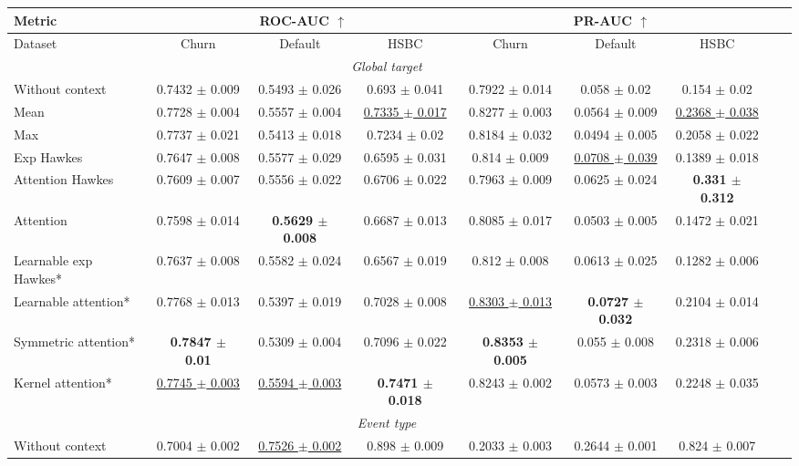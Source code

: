 \begin{table*}[!t]
\centering
\begin{tabular}{lcccccccc}\hline
Metric &\multicolumn{3}{c|}{ROC-AUC $\uparrow$} &\multicolumn{3}{c}{PR-AUC $\uparrow$} \\\hline
Dataset &Churn &Default &HSBC &Churn &Default &HSBC \\
\hline
\multicolumn{7}{c}{\textit{Global target}} \\
\hline
Without context & 0.7432 $\pm$ 0.009 & 0.5493 $\pm$ 0.026 & 0.693 $\pm$ 0.041 & 0.7922 $\pm$ 0.014 & 0.058 $\pm$ 0.02 & 0.154 $\pm$ 0.02 \\
  Mean & 0.7728 $\pm$ 0.004 & 0.5557 $\pm$ 0.004 & \underline{0.7335 $\pm$ 0.017} & 0.8277 $\pm$ 0.003 & 0.0564 $\pm$ 0.009 & \underline{0.2368 $\pm$ 0.038} \\
  Max & 0.7737 $\pm$ 0.021 & 0.5413 $\pm$ 0.018 & 0.7234 $\pm$ 0.02 & 0.8184 $\pm$ 0.032 & 0.0494 $\pm$ 0.005 & 0.2058 $\pm$ 0.022 \\
  Exp Hawkes & 0.7647 $\pm$ 0.008 & 0.5577 $\pm$ 0.029 & 0.6595 $\pm$ 0.031 & 0.814 $\pm$ 0.009 & \underline{0.0708 $\pm$ 0.039} & 0.1389 $\pm$ 0.018 \\
  Attention Hawkes & 0.7609 $\pm$ 0.007 & 0.5556 $\pm$ 0.022 & 0.6706 $\pm$ 0.022 & 0.7963 $\pm$ 0.009 & 0.0625 $\pm$ 0.024 & \textbf{0.331 $\pm$ 0.312} \\
  Attention & 0.7598 $\pm$ 0.014 & \textbf{0.5629 $\pm$ 0.008} & 0.6687 $\pm$ 0.013 & 0.8085 $\pm$ 0.017 & 0.0503 $\pm$ 0.005 & 0.1472 $\pm$ 0.021 \\
  Learnable exp Hawkes* & 0.7637 $\pm$ 0.008 & 0.5582 $\pm$ 0.024 & 0.6567 $\pm$ 0.019 & 0.812 $\pm$ 0.008 & 0.0613 $\pm$ 0.025 & 0.1282 $\pm$ 0.006 \\
  Learnable attention* & 0.7768 $\pm$ 0.013 & 0.5397 $\pm$ 0.019 & 0.7028 $\pm$ 0.008 & \underline{0.8303 $\pm$ 0.013} & \textbf{0.0727 $\pm$ 0.032 }& 0.2104 $\pm$ 0.014 \\
  Symmetric attention* & \textbf{0.7847 $\pm$ 0.01} & 0.5309 $\pm$ 0.004 & 0.7096 $\pm$ 0.022 & \textbf{0.8353 $\pm$ 0.005} & 0.055 $\pm$ 0.008 & 0.2318 $\pm$ 0.006 \\
  Kernel attention* & \underline{0.7745 $\pm$ 0.003} & \underline{0.5594 $\pm$ 0.003} & \textbf{0.7471 $\pm$ 0.018} & 0.8243 $\pm$ 0.002 & 0.0573 $\pm$ 0.003 & 0.2248 $\pm$ 0.035 \\
\hline
\multicolumn{7}{c}{\textit{Event type}} \\
\hline
Without context & 0.7004 $\pm$ 0.002 & \underline{0.7526 $\pm$ 0.002} & 0.898 $\pm$ 0.009 & 0.2033 $\pm$ 0.003 & 0.2644 $\pm$ 0.001 & 0.824 $\pm$ 0.007 \\

\end{tabular}
\end{table*}
